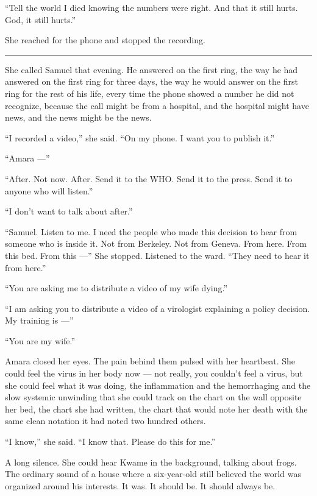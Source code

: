 ``Tell the world I died knowing the numbers were right. And that it still hurts. God, it still hurts.''

She reached for the phone and stopped the recording.

\begin{center}\rule{0.3\linewidth}{0.4pt}\end{center}

She called Samuel that evening. He answered on the first ring, the way he had answered on the first ring for three days, the way he would answer on the first ring for the rest of his life, every time the phone showed a number he did not recognize, because the call might be from a hospital, and the hospital might have news, and the news might be the news.

``I recorded a video,'' she said. ``On my phone. I want you to publish it.''

``Amara ---''

``After. Not now. After. Send it to the WHO. Send it to the press. Send it to anyone who will listen.''

``I don't want to talk about after.''

``Samuel. Listen to me. I need the people who made this decision to hear from someone who is inside it. Not from Berkeley. Not from Geneva. From here. From this bed. From this ---'' She stopped. Listened to the ward. ``They need to hear it from here.''

``You are asking me to distribute a video of my wife dying.''

``I am asking you to distribute a video of a virologist explaining a policy decision. My training is ---''

``You are my wife.''

Amara closed her eyes. The pain behind them pulsed with her heartbeat. She could feel the virus in her body now --- not really, you couldn't feel a virus, but she could feel what it was doing, the inflammation and the hemorrhaging and the slow systemic unwinding that she could track on the chart on the wall opposite her bed, the chart she had written, the chart that would note her death with the same clean notation it had noted two hundred others.

``I know,'' she said. ``I know that. Please do this for me.''

A long silence. She could hear Kwame in the background, talking about frogs. The ordinary sound of a house where a six-year-old still believed the world was organized around his interests. It was. It should be. It should always be.

